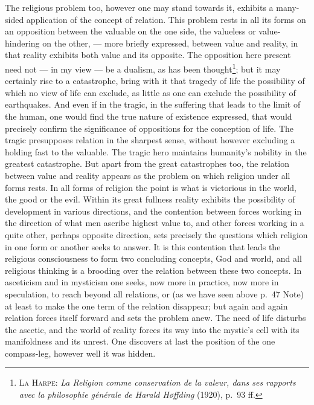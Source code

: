 \documentclass[12pt]{article}
\newcommand{\opage}[1]{\marginnote{\footnotesize\textit{[#1]}}}
\begin{document}
\noindent The religious problem too, however one may stand towards it,
exhibits a many-sided application of the concept of relation. This problem
rests in all its forms on an opposition between the valuable on the one
side, the valueless or value-hindering on the other, --- more briefly
expressed, between value and reality, in that reality exhibits both value
and its opposite. The opposition here present need not --- in my \opage{95}view --- be
a dualism, as has been thought\footnote{\textsc{La Harpe}: \textit{La
Religion comme conservation de la valeur, dans ses rapports avec la
philosophie générale de Harald Høffding} (1920), p.~93 ff.}; but it may
certainly rise to a catastrophe, bring with it that tragedy of life the
possibility of which no view of life can exclude, as little as one can
exclude the possibility of earthquakes. And even if in the tragic, in the
suffering that leads to the limit of the human, one would find the true
nature of existence expressed, that would precisely confirm the significance
of oppositions for the conception of life. The tragic presupposes relation
in the sharpest sense, without however excluding a holding fast to the
valuable. The tragic hero maintains humanity's nobility in the greatest
catastrophe. But apart from the great catastrophes too, the relation between
value and reality appears as the problem on which religion under all forms
rests. In all forms of religion the point is what is victorious in the
world, the good or the evil. Within its great fullness reality exhibits the
possibility of development in various directions, and the contention between
forces working in the direction of what men ascribe highest value to, and
other forces working in a quite other, perhaps opposite direction, sets
precisely the questions which religion in one form or another seeks to
answer. It is this contention that leads the religious consciousness to form
two concluding concepts, God and world, and all religious thinking is a
brooding over the relation between these two concepts. In asceticism and in
mysticism one seeks, now more in practice, now more in speculation, to reach
beyond all relations, or (as we have seen above p.~47 Note) at least to make
the one term of the relation disappear; but again and again relation forces
itself forward and sets the problem anew. The need of life disturbs the
ascetic, \opage{96}and the world of reality forces its way into the mystic's cell with
its manifoldness and its unrest. One discovers at last the position of the
one compass-leg, however well it was hidden.
\end{document}
